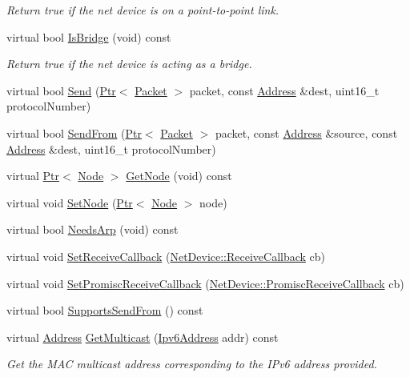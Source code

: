 \begin{DoxyCompactItemize}
\begin{DoxyCompactList}\small\item\em Return true if the net device is on a point-\/to-\/point link. \end{DoxyCompactList}\item 
virtual bool \hyperlink{classns3_1_1TapBridge_a95e3ba17b506b9aaae4d3cfd1b4356b0}{Is\+Bridge} (void) const 
\begin{DoxyCompactList}\small\item\em Return true if the net device is acting as a bridge. \end{DoxyCompactList}\item 
virtual bool \hyperlink{classns3_1_1TapBridge_a3273f1c6353f38dea443e2abad4c3d21}{Send} (\hyperlink{classns3_1_1Ptr}{Ptr}$<$ \hyperlink{classns3_1_1Packet}{Packet} $>$ packet, const \hyperlink{classns3_1_1Address}{Address} \&dest, uint16\+\_\+t protocol\+Number)
\item 
virtual bool \hyperlink{classns3_1_1TapBridge_a6e6cf6042cc65529a8591e0d01518153}{Send\+From} (\hyperlink{classns3_1_1Ptr}{Ptr}$<$ \hyperlink{classns3_1_1Packet}{Packet} $>$ packet, const \hyperlink{classns3_1_1Address}{Address} \&source, const \hyperlink{classns3_1_1Address}{Address} \&dest, uint16\+\_\+t protocol\+Number)
\item 
virtual \hyperlink{classns3_1_1Ptr}{Ptr}$<$ \hyperlink{classns3_1_1Node}{Node} $>$ \hyperlink{classns3_1_1TapBridge_ae200e9184e81dcad678e1016ff0375c6}{Get\+Node} (void) const 
\item 
virtual void \hyperlink{classns3_1_1TapBridge_a6e94660e371655a2c6c6f00b3f1e44c2}{Set\+Node} (\hyperlink{classns3_1_1Ptr}{Ptr}$<$ \hyperlink{classns3_1_1Node}{Node} $>$ node)
\item 
virtual bool \hyperlink{classns3_1_1TapBridge_a5a4660c9d4f687bfa6374e5998faae75}{Needs\+Arp} (void) const 
\item 
virtual void \hyperlink{classns3_1_1TapBridge_a44cd4720cc3fcc1a41536697e08320ac}{Set\+Receive\+Callback} (\hyperlink{classns3_1_1NetDevice_ad5e5e1ca187472bc2ba99575d8def568}{Net\+Device\+::\+Receive\+Callback} cb)
\item 
virtual void \hyperlink{classns3_1_1TapBridge_a6621dcd7bfce6367c3451b457fa8145c}{Set\+Promisc\+Receive\+Callback} (\hyperlink{classns3_1_1NetDevice_a427225795919f26c414bee2ea3f31ed2}{Net\+Device\+::\+Promisc\+Receive\+Callback} cb)
\item 
virtual bool \hyperlink{classns3_1_1TapBridge_a56859ceec9c6a575db34bf6acfd510f8}{Supports\+Send\+From} () const 
\item 
virtual \hyperlink{classns3_1_1Address}{Address} \hyperlink{classns3_1_1TapBridge_a2ebaad85807dd1d2fc8a354a46c69076}{Get\+Multicast} (\hyperlink{classns3_1_1Ipv6Address}{Ipv6\+Address} addr) const 
\begin{DoxyCompactList}\small\item\em Get the M\+AC multicast address corresponding to the I\+Pv6 address provided. \end{DoxyCompactList}\end{DoxyCompactItemize}
